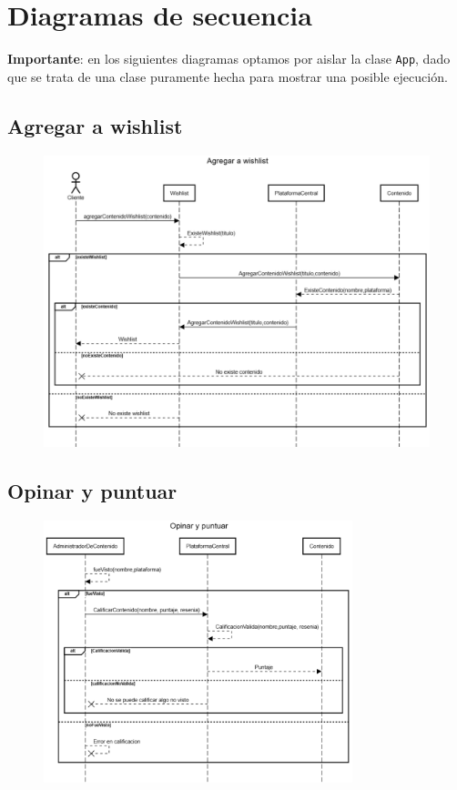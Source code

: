 ﻿\section{Diagramas de secuencia}\label{sec:diagramas}
\textbf{Importante}: en los siguientes diagramas optamos por aislar la clase \lstinline|App|, dado que se trata de una
clase puramente hecha para mostrar una posible ejecución.

\subsection{Agregar a wishlist}\label{subsec:agregar-a-wishlist}
\begin{figure}[h]
    \centering
    \includegraphics[width=1\textwidth]{img/agregar_a_wishlist.png}
\end{figure}

\clearpage

\subsection{Opinar y puntuar}\label{subsec:opinar-y-puntuar}
\begin{figure}[h]
    \centering
    \includegraphics[width=0.8\textwidth]{img/opinar_y_puntuar.png}
\end{figure}

